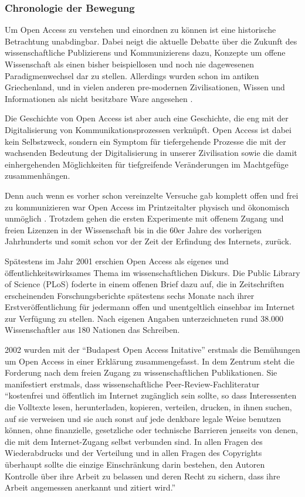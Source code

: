 \subsubsection{Chronologie der Bewegung}
Um Open Access zu verstehen und einordnen zu können ist eine historische Betrachtung unabdingbar. Dabei neigt die aktuelle Debatte über die Zukunft des wissenschaftliche Publizierens und Kommunizierens dazu, Konzepte um offene Wissenschaft als einen bisher beispiellosen und noch nie dagewesenen Paradigmenwechsel dar zu stellen. Allerdings wurden schon im antiken Griechenland, und in vielen anderen pre-modernen Zivilisationen, Wissen und Informationen als nicht besitzbare Ware angesehen .

Die Geschichte von Open Access ist aber auch eine Geschichte, die eng mit der Digitalisierung von Kommunikationsprozessen verknüpft. Open Access ist dabei kein Selbstzweck, sondern ein Symptom für tiefergehende Prozesse die mit der wachsenden Bedeutung der Digitalisierung in unserer Zivilisation sowie die damit einhergehenden Möglichkeiten für tiefgreifende Veränderungen im Machtgefüge zusammenhängen. 

Denn auch wenn es vorher schon vereinzelte Versuche gab komplett offen und frei zu kommunizieren war Open Access im Printzeitalter physisch und ökonomisch unmöglich . Trotzdem gehen die ersten Experimente mit offenem Zugang und freien Lizenzen in der Wissenschaft bis in die 60er Jahre des vorherigen Jahrhunderts und somit schon vor der Zeit der Erfindung des Internets, zurück.


Spätestens im Jahr 2001 erschien Open Access als eigenes und öffentlichkeitswirksames Thema im wissenschaftlichen Diskurs.  Die Public Library of Science (PLoS) foderte in einem offenen Brief  dazu auf, die in Zeitschriften erscheinenden Forschungsberichte spätestens sechs Monate nach ihrer Erstveröffentlichung für jedermann offen und unentgeltlich einsehbar im Internet zur Verfügung zu stellen. Nach eigenen Angaben unterzeichneten rund 38.000 Wissenschaftler aus 180 Nationen das Schreiben.

2002 wurden mit der “Budapest Open Access Initative”  erstmals die Bemühungen um Open Access in einer Erklärung zusammengefasst. In dem Zentrum steht die Forderung nach dem freien Zugang zu wissenschaftlichen Publikationen. Sie manifestiert erstmals, dass wissenschaftliche Peer-Review-Fachliteratur “kostenfrei und öffentlich im Internet zugänglich sein sollte, so dass Interessenten die Volltexte lesen, herunterladen, kopieren, verteilen, drucken, in ihnen suchen, auf sie verweisen und sie auch sonst auf jede denkbare legale Weise benutzen können, ohne finanzielle, gesetzliche oder technische Barrieren jenseits von denen, die mit dem Internet-Zugang selbst verbunden sind. In allen Fragen des Wiederabdrucks und der Verteilung und in allen Fragen des Copyrights überhaupt sollte die einzige Einschränkung darin bestehen, den Autoren Kontrolle über ihre Arbeit zu belassen und deren Recht zu sichern, dass ihre Arbeit angemessen anerkannt und zitiert wird.” 

